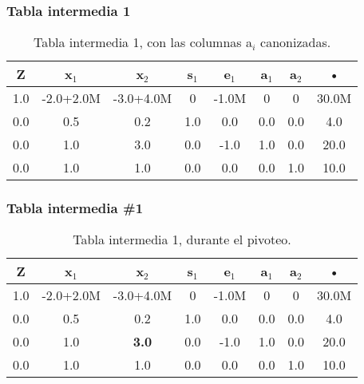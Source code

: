 \documentclass{beamer}
\begin{document}
 
\begin{frame}  
\frametitle{Tabla intermedia 1} 
\begin{table}[H] 
\begin{center} 
\begin{tabular}{|*{8}{c|}} 
\hline 
\textbf{Z}  & \textbf{x$_{1}$} & \textbf{x$_{2}$} & \textbf{s$_{1}$} & \textbf{e$_{1}$} & \textbf{a$_{1}$} & \textbf{a$_{2}$} & \textbf{•} \\\hline \hline 
1.0 & -2.0+2.0M & -3.0+4.0M & 0 & -1.0M & 0 & 0 & 30.0M \\\hline 
0.0 & 0.5 & 0.2 & 1.0 & 0.0 & 0.0 & 0.0 & 4.0\\ 
\hline 
0.0 & 1.0 & 3.0 & 0.0 & -1.0 & 1.0 & 0.0 & 20.0\\ 
\hline 
0.0 & 1.0 & 1.0 & 0.0 & 0.0 & 0.0 & 1.0 & 10.0\\ 
\hline 
\end{tabular} 
\caption{Tabla intermedia 1, con las columnas a$_{i}$ canonizadas.} 
\end{center} 
\end{table} 
\end{frame} 
 
 
\begin{frame}  
\frametitle{Tabla intermedia \#1} 
\begin{table}[H] 
\begin{center} 
\begin{tabular}{|*{8}{c|}} 
\hline 
\textbf{Z}  & \textbf{x$_{1}$} & \cellcolor{color_columna_candidata}\textcolor{color_blanco}{\textbf{x$_{2}$}} & \textbf{s$_{1}$} & \textbf{e$_{1}$} & \textbf{a$_{1}$} & \textbf{a$_{2}$} & \textbf{•} \\\hline \hline 
1.0 & -2.0+2.0M & \cellcolor{color_columna_candidata}\textcolor{color_blanco}{-3.0+4.0M} & 0 & -1.0M & 0 & 0 & 30.0M \\\hline 
0.0 & 0.5 & \cellcolor{color_columna_candidata}\textcolor{color_blanco}{0.2} & 1.0 & 0.0 & 0.0 & 0.0 & 4.0\\ 
\hline 
0.0 & 1.0 & \cellcolor{color_pivote}\textbf{3.0} & 0.0 & -1.0 & 1.0 & 0.0 & 20.0\\ 
\hline 
0.0 & 1.0 & \cellcolor{color_columna_candidata}\textcolor{color_blanco}{1.0} & 0.0 & 0.0 & 0.0 & 1.0 & 10.0\\ 
\hline 
\end{tabular} 
\caption{Tabla intermedia 1, durante el pivoteo.} 
\end{center} 
\end{table} 
\end{frame} 
 
\end{document}
